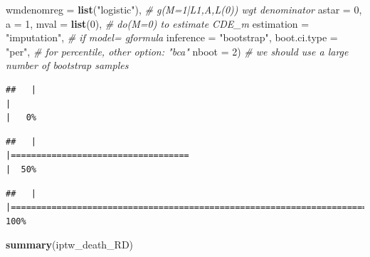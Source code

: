 \documentclass[
]{book}
\newenvironment{Shaded}{\begin{snugshade}}{\end{snugshade}}
\newcommand{\AttributeTok}[1]{\textcolor[rgb]{0.13,0.29,0.53}{#1}}
\newcommand{\CommentTok}[1]{\textcolor[rgb]{0.56,0.35,0.01}{\textit{#1}}}
\newcommand{\DecValTok}[1]{\textcolor[rgb]{0.00,0.00,0.81}{#1}}
\newcommand{\FunctionTok}[1]{\textcolor[rgb]{0.13,0.29,0.53}{\textbf{#1}}}
\newcommand{\NormalTok}[1]{#1}
\newcommand{\StringTok}[1]{\textcolor[rgb]{0.31,0.60,0.02}{#1}}
\begin{document}
\begin{Shaded}
\begin{Highlighting}[]
                       \AttributeTok{wmdenomreg =} \FunctionTok{list}\NormalTok{(}\StringTok{"logistic"}\NormalTok{), }\CommentTok{\# g(M=1|L1,A,L(0)) wgt denominator}
                       \AttributeTok{astar =} \DecValTok{0}\NormalTok{,}
                       \AttributeTok{a =} \DecValTok{1}\NormalTok{,}
                       \AttributeTok{mval =} \FunctionTok{list}\NormalTok{(}\DecValTok{0}\NormalTok{), }\CommentTok{\# do(M=0) to estimate CDE\_m}
                       \AttributeTok{estimation =} \StringTok{"imputation"}\NormalTok{, }\CommentTok{\# if model= gformula}
                       \AttributeTok{inference =} \StringTok{"bootstrap"}\NormalTok{,}
                       \AttributeTok{boot.ci.type =} \StringTok{"per"}\NormalTok{, }\CommentTok{\# for percentile, other option: "bca"}
                       \AttributeTok{nboot =} \DecValTok{2}\NormalTok{) }\CommentTok{\# we should use a large number of bootstrap samples}
\end{Highlighting}
\end{Shaded}

\begin{verbatim}
##   |                                                                              |                                                                      |   0%
\end{verbatim}

\begin{verbatim}
##   |                                                                              |===================================                                   |  50%
\end{verbatim}

\begin{verbatim}
##   |                                                                              |======================================================================| 100%
\end{verbatim}

\begin{Shaded}
\begin{Highlighting}[]
\FunctionTok{summary}\NormalTok{(iptw\_death\_RD)}
\end{Highlighting}
\end{Shaded}
\end{document}
